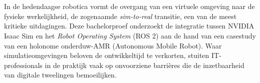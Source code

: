 
%
%
%
%
%

%



\chapter*{}
In de hedendaagse robotica vormt de overgang van een virtuele omgeving naar de fysieke werkelijkheid, de zogenaamde \textit{sim-to-real} transitie, een van de meest kritieke uitdagingen. Deze bachelorproef onderzoekt de integratie tussen NVIDIA Isaac Sim en het \textit{Robot Operating System} (ROS 2) aan de hand van een casestudy van een holonome onderduw-AMR (Autonomous Mobile Robot). Waar simulatieomgevingen beloven de ontwikkeltijd te verkorten, stuiten IT-professionals in de praktijk vaak op onvoorziene barrières die de inzetbaarheid van digitale tweelingen bemoeilijken.

